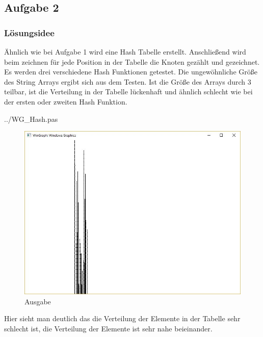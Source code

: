 \documentclass[a4papr,12pt]{article}
\begin{document}
\subsection*{Aufgabe 2}
\subsubsection*{Lösungsidee}
Ähnlich wie bei Aufgabe 1 wird eine Hash Tabelle erstellt. Anschließend wird beim zeichnen für jede Position in der Tabelle die Knoten gezählt und gezeichnet. Es werden drei verschiedene Hash Funktionen getestet. Die ungewöhnliche Größe des String Arrays ergibt sich aus dem Testen. Ist die Größe des Arrays durch 3 teilbar, ist die Verteilung in der Tabelle lückenhaft und ähnlich schlecht wie bei der ersten oder zweiten Hash Funktion.
\newline

 {../WG_Hash.pas}
\begin{figure}[H]
	\centering
	\includegraphics[scale=0.65]{./pictures/bad.jpg}
	\caption{Ausgabe}
	\label{fig: BadHash}
\end{figure}
Hier sieht man deutlich das die Verteilung der Elemente in der Tabelle sehr schlecht ist, die Verteilung der Elemente ist sehr nahe beieinander.
\end{document}
